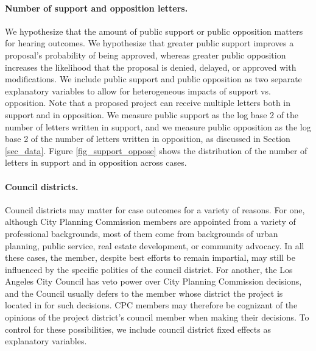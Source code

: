 \paragraph{Number of support and opposition letters.} We hypothesize that the amount of public support or public opposition matters for hearing outcomes. We hypothesize that greater public support improves a proposal's probability of being approved, whereas greater public opposition increases the likelihood that the proposal is denied, delayed, or approved with modifications. We include public support and public opposition as two separate explanatory variables to allow for heterogeneous impacts of support vs. opposition. Note that a proposed project can receive multiple letters both in support and in opposition. We measure public support as the log base 2 of the number of letters written in support, and we measure public opposition as the log base 2 of the number of letters written in opposition, as discussed in Section \ref{sec_data}. Figure \ref{fig_support_oppose} shows the distribution of the number of letters in support and in opposition across cases. 

\paragraph{Council districts.} Council districts may matter for case outcomes for a variety of reasons. For one, although City Planning Commission members are appointed from a variety of professional backgrounds, most of them come from backgrounds of urban planning, public service, real estate development, or community advocacy. In all these cases, the member, despite best efforts to remain impartial, may still be influenced by the specific politics of the council district. For another, the Los Angeles City Council has veto power over City Planning Commission decisions, and the Council usually defers to the member whose district the project is located in for such decisions. CPC members may therefore be cognizant of the opinions of the project district's council member when making their decisions. To control for these possibilities, we include council district fixed effects as explanatory variables.


